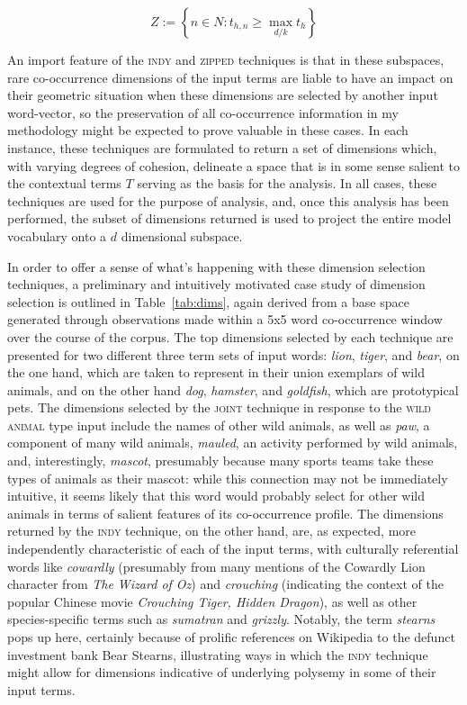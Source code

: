 \begin{equation}
Z := \left \{n \in N: t_{h,n} \geq \max_{d/k} t_h \right \}
\end{equation}

\noindent An import feature of the \textsc{indy} and \textsc{zipped} techniques is that in these subspaces, rare co-occurrence dimensions of the input terms are liable to have an impact on their geometric situation when these dimensions are selected by another input word-vector, so the preservation of all co-occurrence information in my methodology might be expected to prove valuable in these cases.  In each instance, these techniques are formulated to return a set of dimensions which, with varying degrees of cohesion, delineate a space that is in some sense salient to the contextual terms $T$ serving as the basis for the analysis.  In all cases, these techniques are used for the purpose of analysis, and, once this analysis has been performed, the subset of dimensions returned is used to project the entire model vocabulary onto a $d$ dimensional subspace.

In order to offer a sense of what's happening with these dimension selection techniques, a preliminary and intuitively motivated case study of dimension selection is outlined in Table~\ref{tab:dims}, again derived from a base space generated through observations made within a 5x5 word co-occurrence window over the course of the corpus.  The top dimensions selected by each technique are presented for two different three term sets of input words: \emph{lion}, \emph{tiger}, and \emph{bear}, on the one hand, which are taken to represent in their union exemplars of wild animals, and on the other hand \emph{dog}, \emph{hamster}, and \emph{goldfish}, which are prototypical pets.  The dimensions selected by the \textsc{joint} technique in response to the \textsc{wild animal} type input include the names of other wild animals, as well as \emph{paw}, a component of many wild animals, \emph{mauled}, an activity performed by wild animals, and, interestingly, \emph{mascot}, presumably because many sports teams take these types of animals as their mascot: while this connection may not be immediately intuitive, it seems likely that this word would probably select for other wild animals in terms of salient features of its co-occurrence profile.  The dimensions returned by the \textsc{indy} technique, on the other hand, are, as expected, more independently characteristic of each of the input terms, with culturally referential words like \emph{cowardly} (presumably from many mentions of the Cowardly Lion character from \emph{The Wizard of Oz}) and \emph{crouching} (indicating the context of the popular Chinese movie \emph{Crouching Tiger, Hidden Dragon}), as well as other species-specific terms such as \emph{sumatran} and \emph{grizzly}.  Notably, the term \emph{stearns} pops up here, certainly because of prolific references on Wikipedia to the defunct investment bank Bear Stearns, illustrating ways in which the \textsc{indy} technique might allow for dimensions indicative of underlying polysemy in some of their input terms.

